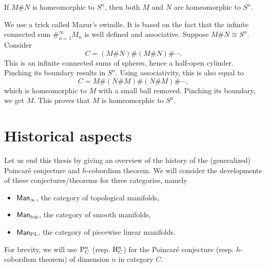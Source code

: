 \begin{lemma}
    If $M \# N$ is homeomorphic to $S^{n}$, then both $M$ and $N$ are homeomorphic to $S^{n}$.
\end{lemma}
\begin{myproof}
    We use a trick called Mazur's swindle.
    It is based on the fact that the infinite connected sum $\#_{n=1}^{\infty} M_n$ is well defined and associative.
    Suppose $M \# N \cong S^{n}$.
    Consider
    \[
       C =  (M \# N) \# 
        (M \# N) \#  \cdots
    .\] 
    This is an infinite connected sums of spheres, hence a half-open cylinder.
    Pinching its boundary results in $S^{n}$.
    Using associativity, this is also equal to
    \[
        C= M
        \# (N \# M)
        \# (N \# M)
        \# \cdots
    ,\] 
    which is homeomorphic to $M$ with a small ball removed. Pinching its boundary, we get $M$.
    This proves that $M$ is homeomorphic to $S^{n}$.
\end{myproof}




\section{Historical aspects}
\label{sec:history}

Let us end this thesis by giving an overview of the history of the (generalized) Poincaré conjecture and $h$-cobordism theorem.
We will consider the developments of these conjectures/theorems for three categories, namely
\begin{itemize}
    \item $\textsf{Man}_{\infty}$, the category of topological manifolds,
    \item $\textsf{Man}_{\text{top}}$, the category of smooth manifolds,
    \item $\textsf{Man}_{\text{PL}}$, the category of piecewise linear manifolds.
\end{itemize}
For brevity, we will use $\mathrm P_{C}^{n}$ (resp. $\mathrm H_{C}^{n}$) for the Poincaré conjecture (resp. $h$-cobordism theorem) of dimension $n$ in category $C$.

